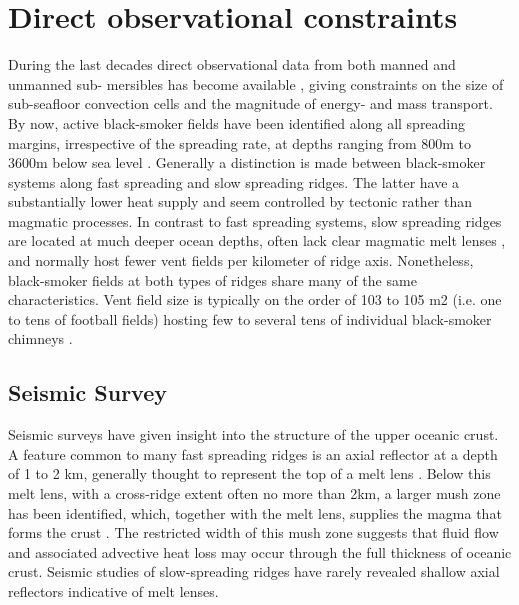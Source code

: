 \section{Direct observational constraints}
During the last decades direct observational data from both manned and unmanned sub-
mersibles has become available , giving constraints on the size of sub-seafloor convection cells and
the magnitude of energy- and mass transport. By now, active black-smoker fields have been
identified along all spreading margins, irrespective of the spreading rate, at depths ranging
from 800m to 3600m below sea level .   Generally a distinction is made
between black-smoker systems along fast spreading and slow spreading ridges.   The latter
have a substantially lower heat supply and seem controlled by tectonic rather than magmatic
processes.   In contrast to fast spreading systems, slow spreading ridges are located at much
deeper ocean depths, often lack clear magmatic melt lenses , and normally host
fewer vent fields per kilometer of ridge axis.   Nonetheless, black-smoker fields at both types
of ridges share many of the same characteristics.   Vent field size is typically on the order of
103 to 105 m2 (i.e.   one to tens of football fields) hosting few to several tens of individual
black-smoker chimneys .

\subsection{Seismic Survey}


Seismic surveys have given insight into the structure of the upper oceanic crust. A feature
common to many fast spreading ridges is an axial reflector at a depth of 1 to 2 km, generally
thought to represent the top of a melt lens .   Below this melt lens, with
a cross-ridge extent often no more than 2km, a larger mush zone has been identified, which,
together with the melt lens, supplies the magma that forms the crust . The restricted width of this mush zone suggests that fluid flow and associated
advective heat loss may occur through the full thickness of oceanic crust. Seismic studies of
slow-spreading ridges have rarely revealed shallow axial reflectors indicative of melt lenses.



